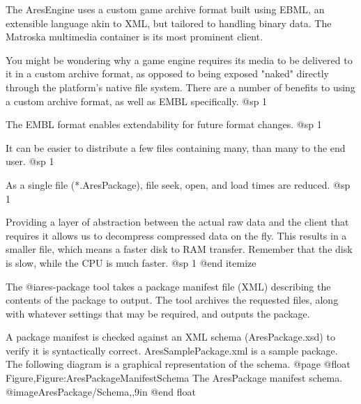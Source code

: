 

The AresEngine uses a custom game archive format built using EBML, an extensible language akin to XML, but tailored to handling binary data. The Matroska multimedia container is its most prominent client.

You might be wondering why a game engine requires its media to be delivered to it in a custom archive format, as opposed to being exposed "naked" directly through the platform's native file system. There are a number of benefits to using a custom archive format, as well as EMBL specifically.
@sp 1

\itemize
\item
The EMBL format enables extendability for future format changes.
@sp 1

\item
It can be easier to distribute a few files containing many, than many to the end user.
@sp 1

\item
As a single file (*.AresPackage), file seek, open, and load times are reduced.
@sp 1

\item
Providing a layer of abstraction between the actual raw data and the client that requires it allows us to decompress compressed data on the fly. This results in a smaller file, which means a faster disk to RAM transfer. Remember that the disk is slow, while the CPU is much faster.
@sp 1
@end itemize

The @i{ares-package} tool takes a package manifest file (XML) describing the contents of the package to output. The tool archives the requested files, along with whatever settings that may be required, and outputs the package.

A package manifest is checked against an XML schema (AresPackage.xsd) to verify it is syntactically correct. AresSamplePackage.xml is a sample package. The following diagram is a graphical representation of the schema.
@page
@float Figure,Figure:AresPackageManifestSchema
The AresPackage manifest schema.
@image{AresPackage/Schema,,9in}
@end float

